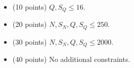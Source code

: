\documentclass[12pt]{scrartcl}
\begin{document}

    \begin{itemize}
        \item (10 points) $Q, S_Q \le 16$.
        \item (20 points) $N, S_N, Q, S_Q \le 250$.
        \item (30 points) $N, S_N, Q, S_Q \le 2000$.
        \item (40 points) No additional constraints.
    \end{itemize}
\end{document}
